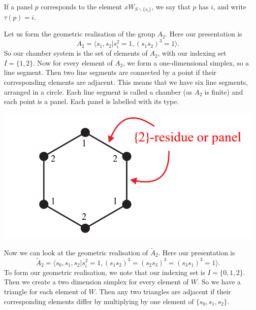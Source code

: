 \documentclass[11pt]{article}
\begin{document}

\begin{definition}
    If a panel $p$ corresponds to the element $xW_{S\backslash \{s_i\}}$, we say that $p$ has  $i$, and write $\tau(p)=i$. 
\end{definition}

Let us form the geometric realisation of the group $A_2$. Here our presentation is 
\[A_2=\langle s_1,s_2|s_i^2=1, (s_1s_2)^3=1\rangle.\]
So our chamber system is the set of elements of $A_2$, with our indexing set $I=\{1,2\}$. Now for every element of $A_2$, we form a one-dimensional simplex, so a line segment. Then two line segments are connected by a point if their corresponding elements are adjacent. This means that we have six line segments, arranged in a circle. Each line segment is called a chamber (as $A_2$ is finite) and each point is a panel. Each panel is labelled with its type.

\begin{center}
    \includegraphics[scale=0.5]{Screenshot 2023-03-21 135437.png}\\
\end{center}



Now we can look at the geometric realisation of $\tilde{A}_2$. Here our presentation is
 \[\tilde{A}_2=\langle s_0,s_1,s_2|s_i^2=1, (s_1s_2)^3=(s_2s_3)^3=(s_3s_1)^3=1\rangle.\]
To form our geometric realisation, we note that our indexing set is $I=\{0,1,2\}$. Then we create a two dimension simplex for every element of $W$. So we have a triangle for each element of $W$. Then any two triangles are adjacent if their corresponding elements differ by multiplying by one element of $\{s_0,s_1,s_2\}$. 
\end{document}
